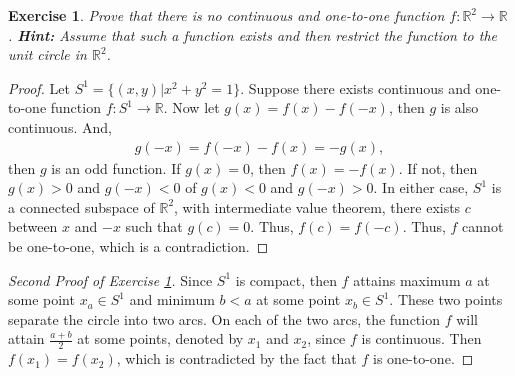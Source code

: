 \documentclass[11pt]{article}
\newtheorem{exercise}{Exercise}[section]
\theoremstyle{definition}
\numberwithin{equation}{subsection}
\begin{document}
\begin{exercise}\label{May_2019_3}
Prove that there is no continuous and one-to-one function $f:\mathbb{R}^2 \to \mathbb{R}$. \textbf{Hint:} \textit{Assume that such a function exists and then restrict the function to the unit circle in $\mathbb{R}^2$}.
\end{exercise}
\begin{proof}
Let $S^1 = \{(x,y)| x^2 + y^2 = 1\}$. Suppose there exists continuous and one-to-one function $f: S^1 \to \mathbb{R}$. Now let $g(x) = f(x) - f(-x)$, then $g$ is also continuous. And,
\begin{align*}
    g(-x) = f(-x) - f(x) = - g(x),
\end{align*}
then $g$ is an odd function. If $g(x) = 0$, then $f(x) = -f(x)$. If not, then $g(x) > 0$ and $g(-x) < 0$ of $g(x) < 0$ and $g(-x) > 0$. In either case, $S^1$ is a connected subspace of $\mathbb{R}^2$, with intermediate value theorem, there exists $c$ between $x$ and $-x$ such that $g(c) = 0$. Thus, $f(c) = f(-c)$. Thus, $f$ cannot be one-to-one, which is a contradiction\cite{2}.
\end{proof}

\medskip

\begin{proof}[Second Proof of Exercise \ref{May_2019_3}]
Since $S^1$ is compact, then $f$ attains maximum $a$ at some point $x_a \in S^1$ and minimum $b < a$ at some point $x_b \in S^1$. These two points separate the circle into two arcs. On each of the two arcs, the function $f$ will attain $\frac{a+b}{2}$ at some points, denoted by $x_1$ and $x_2$, since $f$ is continuous. Then $f(x_1) = f(x_2)$, which is contradicted by the fact that $f$ is one-to-one\cite{3}.
\end{proof}

\medskip
\end{document}
